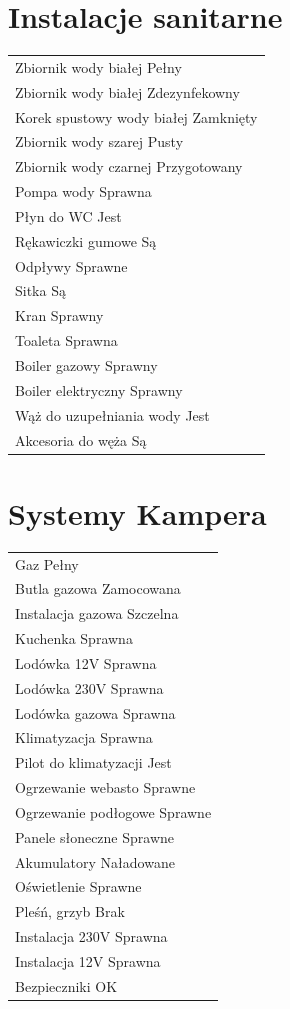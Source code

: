 \documentclass{article}
\begin{document}
\begin{multicols}{2}
\section{Instalacje sanitarne}
\begin{tabularx}{\columnwidth}{|X|}
\hline
Zbiornik wody białej \dotfill Pełny \\
Zbiornik wody białej \dotfill Zdezynfekowny \\
Korek spustowy wody białej \dotfill Zamknięty \\
Zbiornik wody szarej \dotfill Pusty \\
Zbiornik wody czarnej \dotfill Przygotowany \\
Pompa wody \dotfill Sprawna \\
Płyn do WC \dotfill Jest \\
Rękawiczki gumowe \dotfill Są \\
Odpływy \dotfill Sprawne \\
Sitka \dotfill Są \\
Kran \dotfill Sprawny \\
Toaleta \dotfill Sprawna \\
Boiler gazowy \dotfill Sprawny \\
Boiler elektryczny \dotfill Sprawny \\
Wąż do uzupełniania wody \dotfill Jest \\
Akcesoria do węża \dotfill Są \\
\hline
\end{tabularx}

\section{Systemy Kampera}
\begin{tabularx}{\columnwidth}{|X|}
\hline
Gaz \dotfill Pełny \\
Butla gazowa \dotfill Zamocowana \\
Instalacja gazowa \dotfill Szczelna \\
Kuchenka \dotfill Sprawna \\
Lodówka 12V \dotfill Sprawna \\
Lodówka 230V \dotfill Sprawna \\
Lodówka gazowa \dotfill Sprawna \\
Klimatyzacja \dotfill Sprawna \\
Pilot do klimatyzacji \dotfill Jest \\
Ogrzewanie webasto \dotfill Sprawne \\
Ogrzewanie podłogowe \dotfill Sprawne \\
Panele słoneczne \dotfill Sprawne \\
Akumulatory \dotfill Naładowane \\
Oświetlenie \dotfill Sprawne \\
Pleśń, grzyb \dotfill Brak \\
Instalacja 230V \dotfill Sprawna \\
Instalacja 12V \dotfill Sprawna \\
Bezpieczniki \dotfill OK \\
\hline
\end{tabularx}


\end{multicols}
\end{document}
